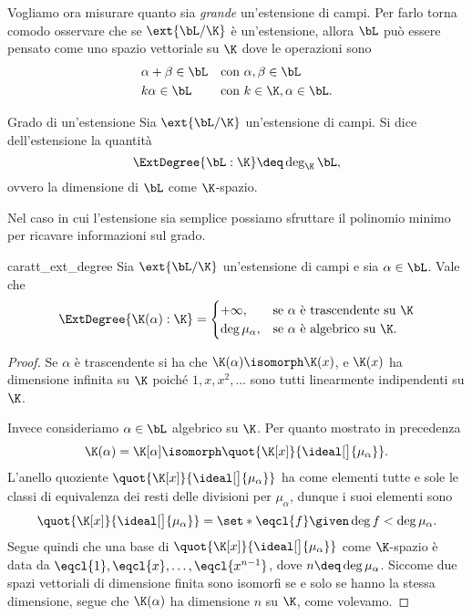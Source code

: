 Vogliamo ora misurare quanto sia \emph{grande} un'estensione di campi. Per farlo torna comodo osservare che se $\ext{\bL / \K}$ è un'estensione, allora $\bL$ può essere pensato come uno spazio vettoriale su $\K$ dove le operazioni sono \begin{align*}
    &\alpha + \beta \in \bL &&\text{con } \alpha, \beta \in \bL\\
    &k\alpha \in \bL        &&\text{con } k \in \K, \alpha \in \bL.
\end{align*}  

\begin{definition}
    {Grado di un'estensione}{}
    Sia $\ext{\bL / \K}$ un'estensione di campi. Si dice  dell'estensione la quantità \[
        \ExtDegree{\bL : \K} \deq \deg_{\K} \bL,
    \] ovvero la dimensione di $\bL$ come $\K$-spazio.
\end{definition}

Nel caso in cui l'estensione sia semplice possiamo sfruttare il polinomio minimo per ricavare informazioni sul grado. 
\begin{proposition}{}{caratt_ext_degree}
    Sia $\ext{\bL / \K}$ un'estensione di campi e sia $\alpha \in \bL$. Vale che \[
        \ExtDegree{\K(\alpha): \K} = \begin{cases}
            +\infty, &\text{se $\alpha$ è trascendente su $\K$}\\
            \deg \mu_\alpha, &\text{se $\alpha$ è algebrico su $\K$}.
        \end{cases}
    \] 
\end{proposition}
\begin{proof}
    Se $\alpha$ è trascendente si ha che $\K(\alpha) \isomorph \K(x)$, e $\K(x)$ ha dimensione infinita su $\K$ poiché $1, x, x^2, \dots$ sono tutti linearmente indipendenti su $\K$.
    
    Invece consideriamo $\alpha \in \bL$ algebrico su $\K$. Per quanto mostrato in precedenza \[
        \K(\alpha) = \K[\alpha] \isomorph \quot{\K[x]}{\ideal[\big]{\mu_\alpha}}.
    \] L'anello quoziente $\quot{\K[x]}{\ideal[\big]{\mu_\alpha}}$ ha come elementi tutte e sole le classi di equivalenza dei resti delle divisioni per $\mu_\alpha$, dunque i suoi elementi sono \[
        \quot{\K[x]}{\ideal[\big]{\mu_\alpha}} = \set*{\eqcl{f} \given \deg f < \deg \mu_\alpha}.
    \] Segue quindi che una base di $\quot{\K[x]}{\ideal[\big]{\mu_\alpha}}$ come $\K$-spazio è data da $\eqcl{1}, \eqcl{x}, \dots, \eqcl{x^{n-1}}$, dove $n \deq \deg \mu_\alpha$. Siccome due spazi vettoriali di dimensione finita sono isomorfi se e solo se hanno la stessa dimensione, segue che $\K(\alpha)$ ha dimensione $n$ su $\K$, come volevamo. 
\end{proof}

